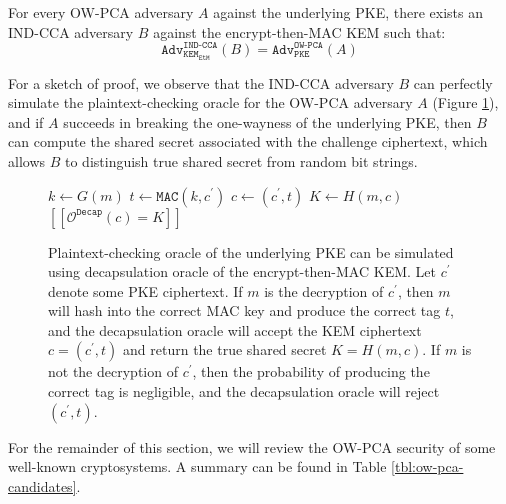 \documentclass[runningheads]{llncs}
\newcommand{\pke}{\texttt{PKE}}
\newcommand{\kem}{\texttt{KEM}}
\newcommand{\decap}{\texttt{Decap}}
\newcommand{\etm}{\texttt{EtM}}  %
\newcommand{\mac}{\texttt{MAC}}
\newcommand{\pco}{\texttt{PCO}}
\newcommand{\llbrack}{[\![}
\newcommand{\rrbrack}{]\!]}
\newcommand{\adv}{\texttt{Adv}}
\begin{document}
\begin{lemma}\label{lemma:ind-cca-implies-ow-pca}
    For every OW-PCA adversary $A$ against the underlying PKE, there exists an IND-CCA adversary $B$ against the encrypt-then-MAC KEM such that:
    \begin{equation*}
        \adv^\texttt{IND-CCA}_{\kem_\etm}(B) = \adv^\texttt{OW-PCA}_{\pke}(A)
    \end{equation*}
\end{lemma}

For a sketch of proof, we observe that the IND-CCA adversary $B$ can perfectly simulate the plaintext-checking oracle for the OW-PCA adversary $A$ (Figure \ref{fig:simulate-pca-oracle-with-cca-oracle}), and if $A$ succeeds in breaking the one-wayness of the underlying PKE, then $B$ can compute the shared secret associated with the challenge ciphertext, which allows $B$ to distinguish true shared secret from random bit strings.

\begin{figure}[h]
    \centering
    \begin{minipage}[t]{0.4\textwidth}
        \begin{algorithm}[H]
            \caption*{$\mathcal{O}^\pco_\decap(m, c^\prime)$}
            \begin{algorithmic}[1]
                \State $k \leftarrow G(m)$
                \State $t \leftarrow \mac(k, c^\prime)$
                \State $c \leftarrow (c^\prime, t)$
                \State $K \leftarrow H(m, c)$
                \State \Return $\llbrack \mathcal{O}^\decap(c) = K\rrbrack$
            \end{algorithmic}
        \end{algorithm}
    \end{minipage}
    \caption{Plaintext-checking oracle of the underlying PKE can be simulated using decapsulation oracle of the encrypt-then-MAC KEM. Let $c^\prime$ denote some PKE ciphertext. If $m$ is the decryption of $c^\prime$, then $m$ will hash into the correct MAC key and produce the correct tag $t$, and the decapsulation oracle will accept the KEM ciphertext $c = (c^\prime, t)$ and return the true shared secret $K = H(m, c)$. If $m$ is not the decryption of $c^\prime$, then the probability of producing the correct tag is negligible, and the decapsulation oracle will reject $(c^\prime, t)$.}\label{fig:simulate-pca-oracle-with-cca-oracle}
\end{figure}

For the remainder of this section, we will review the OW-PCA security of some well-known cryptosystems. A summary can be found in Table \ref{tbl:ow-pca-candidates}.
\end{document}
